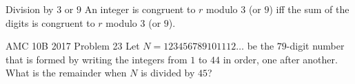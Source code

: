 \documentclass[professionalfont, 12pt, handout, t]{beamer} %
\theoremstyle{plain}
\theoremstyle{definition}
\begin{document}
\begin{frame}{Division by $3$ or $9$}
    An integer is congruent to $r$ modulo $3$ (or $9$) iff the sum of the digits is congruent to $r$ modulo $3$ (or $9$).
\end{frame}


\begin{frame}{AMC 10B 2017 Problem 23}
    Let $N = 123456789101112\dots$ be the $79$-digit number that is formed by writing the integers from $1$ to $44$ in order, one after another.
    What is the remainder when $N$ is divided by $45$?
\end{frame}

        

\begin{frame}{}
    
\end{frame}
\end{document}
